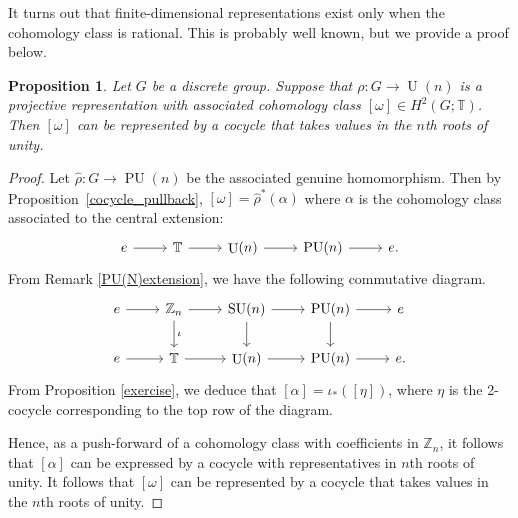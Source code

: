 \documentclass{amsart}
\newtheorem{proposition}[theorem]{Proposition}
\theoremstyle{definition}
\newcommand{\Z}{\mathbb{Z}}
\newcommand{\TT}{\mathbb{T}}
\DeclareMathOperator{\SU}{SU}
\DeclareMathOperator{\U}{U}
\DeclareMathOperator{\PU}{PU}
\begin{document}
It turns out that finite-dimensional representations exist only when the cohomology class is rational. This is probably well known, but we provide a proof below.


\begin{proposition}\label{fd=>rational}
Let $G$ be a discrete group. Suppose that $\rho \colon G\rightarrow \U(n)$ is a projective representation with associated cohomology class $[\omega]\in H^2(G;\TT)$. Then $[\omega]$ can be represented by a cocycle that takes values in the $n$th roots of unity.
\end{proposition}

\begin{proof}
Let $\widehat{\rho}\colon G\rightarrow \PU(n)$ be the associated genuine homomorphism. Then by Proposition~\ref{cocycle_pullback}, $[\omega]=\widehat{\rho}^*(\alpha)$ where $\alpha$ is the cohomology class associated to the central extension:
$$\begin{tikzcd}
e\arrow{r}&\TT\arrow{r}&\U(n)\arrow{r}&\PU(n)\arrow{r}&e.
\end{tikzcd}$$
From Remark \ref{PU(N)extension}, we have the following commutative diagram.
$$\begin{tikzcd}
e\arrow{r}&\Z_n\arrow{r}\arrow[d,"\iota"]&\SU(n)\arrow{d}\arrow{r}&\PU(n)\arrow{r}\arrow{d}&e\\
e\arrow{r}&\TT\arrow{r}&\U(n)\arrow{r}&\PU(n)\arrow{r}&e.
\end{tikzcd}$$
From Proposition \ref{exercise}, we deduce that $[\alpha]=\iota_*([\eta])$, where $\eta$ is the 2-cocycle corresponding to the top row of the diagram. \par
Hence, as a push-forward of a cohomology class with coefficients in $\Z_n$, it follows that $[\alpha]$ can be expressed by a cocycle with representatives in $n$th roots of unity. It follows that $[\omega]$ can be represented by a cocycle that takes values in the $n$th roots of unity.
\end{proof}
\end{document}

